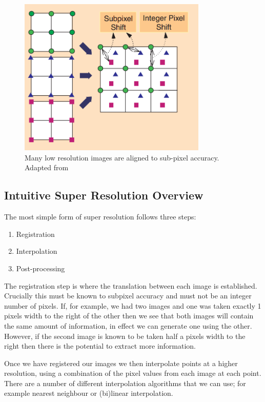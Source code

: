 \begin{figure}[h]
    \centering
	\includegraphics[width=0.8\textwidth]{images/background/super_resolution.png}
    \caption{Many low resolution images are aligned to sub-pixel accuracy. Adapted from \cite{superresolution2}}
    \label{fig:superresolution}
\end{figure}

\subsection*{Intuitive Super Resolution Overview}
The most simple form of super resolution follows three steps:

\begin{enumerate}
	\item Registration
	\item Interpolation
	\item Post-processing
\end{enumerate}

The registration step is where the translation between each image is established. Crucially this must be known to subpixel accuracy and must not be an integer number of pixels. If, for example, we had two images and one was taken exactly 1 pixels width to the right of the other then we see that both images will contain the same amount of information, in effect we can generate one using the other. However, if the second image is known to be taken half a pixels width to the right then there is the potential to extract more information.

Once we have registered our images we then interpolate points at a higher resolution, using a combination of the pixel values from each image at each point. There are a number of different interpolation algorithms that we can use; for example nearest neighbour or (bi)linear interpolation.

